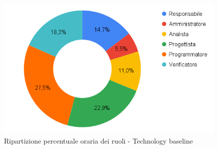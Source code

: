 \begin{figure}[h!]
	\centering
	\includegraphics[scale=0.37]{../../assets/Diagrammi_Excel/torta_ore_TB.png}
	\caption{Ripartizione percentuale oraria dei ruoli - Technology baseline}
\end{figure}


